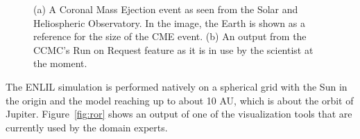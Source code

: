 \documentclass{egpubl}
\begin{document}
\begin{figure}
	\centering
	\caption{(a) A Coronal Mass Ejection event as seen from the Solar and Heliospheric Observatory. In the image, the Earth is shown as a reference for the size of the CME event. (b) An output from the CCMC's Run on Request feature as it is in use by the scientist at the moment.}
\end{figure}

The ENLIL simulation is performed natively on a spherical grid with the Sun in the origin and the model reaching up to about 10 AU, which is about the orbit of Jupiter. Figure~\ref{fig:ror} shows an output of one of the visualization tools that are currently used by the domain experts.
\end{document}
